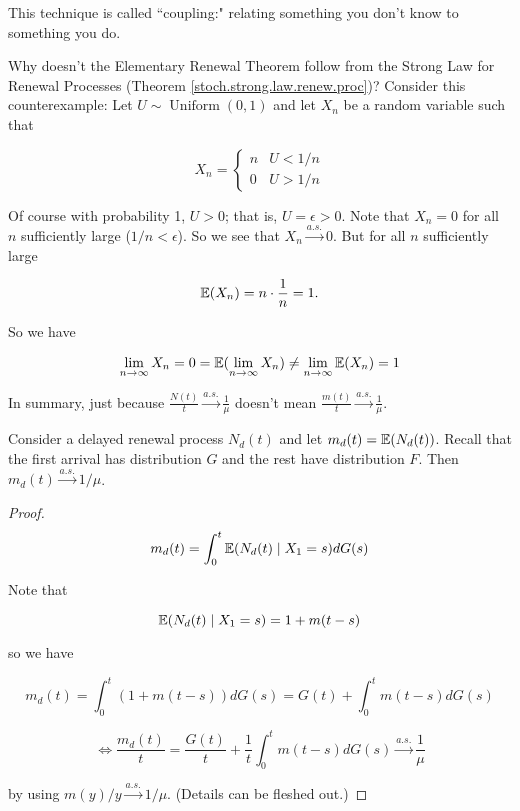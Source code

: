 \begin{remark}This technique is called ``coupling:" relating something you don't know to something you do.

\end{remark}

\begin{remark} Why doesn't the Elementary Renewal Theorem follow from the Strong Law for Renewal Processes (Theorem \ref{stoch.strong.law.renew.proc})? Consider this counterexample: Let \(U \sim \operatorname{Uniform}(0,1)\) and let \(X_n\) be a random variable such that

\[
X_n = \begin{cases}
n & U < 1/n \\
0 & U > 1/n 
\end{cases}
\]

Of course with probability 1, \(U > 0\); that is, \(U = \epsilon > 0\). Note that \(X_n = 0\) for all \(n\) sufficiently large (\(1/n < \epsilon\)). So we see that \(X_n \xrightarrow{a.s.} 0\). But for all \(n\) sufficiently large

\[
\E(X_n) = n \cdot \frac{1}{n} = 1.
\]


So we have

\[
\lim_{n \to \infty} X_n = 0 = \E( \lim_{n \to \infty} X_n) \neq \lim_{n \to \infty} \E(X_n) = 1
\]

In summary, just because \(\frac{N(t)}{t} \xrightarrow{a.s.} \frac{1}{\mu}\) doesn't mean \(\frac{m(t)}{t} \xrightarrow{a.s.} \frac{1}{\mu}.\)
\end{remark}


\begin{proposition}
Consider a delayed renewal process \(N_d(t)\) and let \(m_d(t) = \E(N_d(t))\). Recall that the first arrival has distribution \(G\) and the rest have distribution \(F\).  Then \(m_d(t) \xrightarrow{a.s.} 1/\mu\).

\end{proposition}

\begin{proof}

\[
m_d(t) = \int_0^t \E(N_d(t) \mid X_1 = s) dG(s)
\]

Note that

\[
\E(N_d(t) \mid X_1 = s) = 1 + m(t-s)
\]

so we have

\[
m_d(t) = \int_0^t (1 + m(t-s)) dG(s) = G(t) + \int_0^t m(t-s) dG(s) 
\]

\[
\iff \frac{m_d(t) }{t} = \frac{G(t)}{t} + \frac{1}{t}\int_0^t m(t-s) dG(s) \xrightarrow{a.s.} \frac{1}{\mu}
\]

by using \(m(y)/y \xrightarrow{a.s.} 1/\mu\). (Details can be fleshed out.)

\end{proof}

